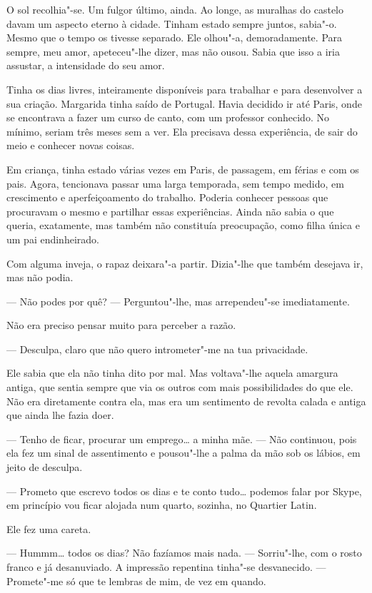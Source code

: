 O sol recolhia"-se. Um fulgor último, ainda. Ao longe, as muralhas do
castelo davam um aspecto eterno à cidade. Tinham estado sempre juntos,
sabia"-o. Mesmo que o tempo os tivesse separado. Ele olhou"-a,
demoradamente. Para sempre, meu amor, apeteceu"-lhe dizer, mas não ousou.
Sabia que isso a iria assustar, a intensidade do seu amor.

Tinha os dias livres, inteiramente disponíveis para trabalhar e para
desenvolver a sua criação. Margarida tinha saído de Portugal. Havia
decidido ir até Paris, onde se encontrava a fazer um curso de canto, com
um professor conhecido. No mínimo, seriam três meses sem a ver. Ela
precisava dessa experiência, de sair do meio e conhecer novas coisas.

Em criança, tinha estado várias vezes em Paris, de passagem, em férias e
com os pais. Agora, tencionava passar uma larga temporada, sem tempo
medido, em crescimento e aperfeiçoamento do trabalho. Poderia conhecer
pessoas que procuravam o mesmo e partilhar essas experiências. Ainda não
sabia o que queria, exatamente, mas também não constituía preocupação,
como filha única e um pai endinheirado.

Com alguma inveja, o rapaz deixara"-a partir. Dizia"-lhe que também
desejava ir, mas não podia.

--- Não podes por quê? --- Perguntou"-lhe, mas arrependeu"-se imediatamente.

Não era preciso pensar muito para perceber a razão.

--- Desculpa, claro que não quero intrometer"-me na tua privacidade.

Ele sabia que ela não tinha dito por mal. Mas voltava"-lhe aquela
amargura antiga, que sentia sempre que via os outros com mais
possibilidades do que ele. Não era diretamente contra ela, mas era um
sentimento de revolta calada e antiga que ainda lhe fazia doer.

--- Tenho de ficar, procurar um emprego\ldots{} a minha mãe. --- Não continuou,
pois ela fez um sinal de assentimento e pousou"-lhe a palma da mão sob os
lábios, em jeito de desculpa.

--- Prometo que escrevo todos os dias e te conto tudo\ldots{} podemos falar por
Skype, em princípio vou ficar alojada num quarto, sozinha, no Quartier
Latin.

Ele fez uma careta.

--- Hummm\ldots{} todos os dias? Não fazíamos mais nada. --- Sorriu"-lhe, com
o rosto franco e já desanuviado. A impressão repentina tinha"-se
desvanecido. --- Promete"-me só que te lembras de mim, de vez em quando.

